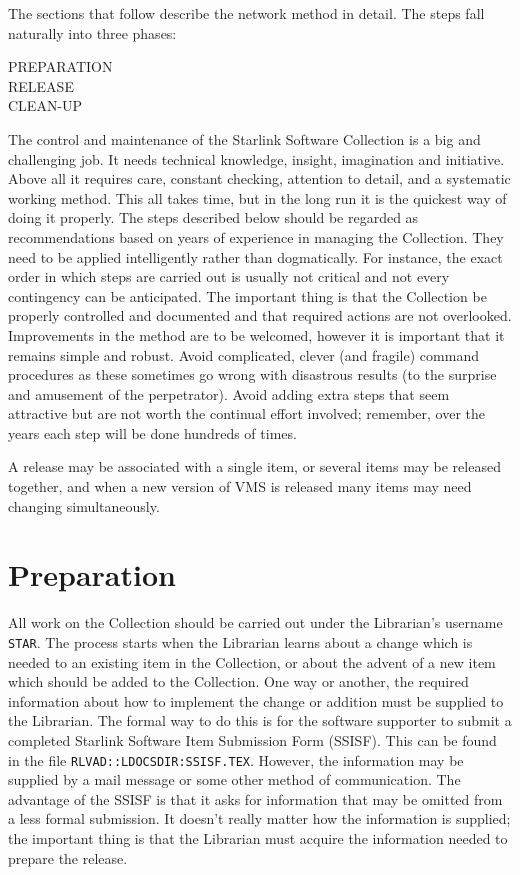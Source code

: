 The sections that follow describe the network method in detail.
The steps fall naturally into three phases:
\begin{description}
\begin{description}
\item [PREPARATION]
\item [RELEASE]
\item [CLEAN-UP]
\end{description}
\end{description}
The control and maintenance of the Starlink Software Collection is a big and
challenging job.
It needs technical knowledge, insight, imagination and initiative.
Above all it requires care, constant checking, attention to detail, and a
systematic working method.
This all takes time, but in the long run it is the quickest way of doing it
properly.
The steps described below should be regarded as recommendations based on years
of experience in managing the Collection.
They need to be applied intelligently rather than dogmatically.
For instance, the exact order in which steps are carried out is usually not
critical and not every contingency can be anticipated.
The important thing is that the Collection be properly controlled and
documented and that required actions are not overlooked.
Improvements in the method are to be welcomed, however it is important that it
remains simple and robust.
Avoid complicated, clever (and fragile) command procedures as these sometimes
go wrong with disastrous results (to the surprise and amusement of the
perpetrator).
Avoid adding extra steps that seem attractive but are not worth the continual
effort involved; remember, over the years each step will be done hundreds of
times.

A release may be associated with a single item, or several  items may be
released together, and when a new version of VMS is released many items may
need changing simultaneously.

\section {Preparation}

All work on the Collection should be carried out under the Librarian's username
{\tt STAR}.
The process starts when the Librarian learns about a change which is needed to
an existing item in the Collection, or about the advent of a new item which
should be added to the Collection.
One way or another, the required information about how to implement the change
or addition must be supplied to the Librarian.
The formal way to do this is for the software supporter to submit a completed
Starlink Software Item Submission Form (SSISF).
This can be found in the file {\tt RLVAD::LDOCSDIR:SSISF.TEX}.
However, the information may be supplied by a mail message or some other
method of communication.
The advantage of the SSISF is that it asks for information that may be omitted
from a less formal submission.
It doesn't really matter how the information is supplied; the important thing
is that the Librarian must acquire the information needed to prepare the
release.

